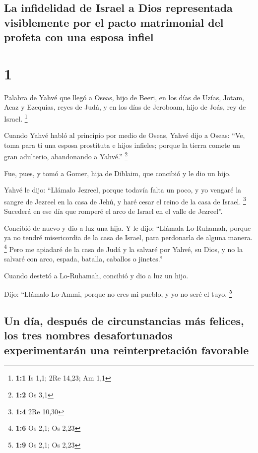 \hypertarget{la-infidelidad-de-israel-a-dios-representada-visiblemente-por-el-pacto-matrimonial-del-profeta-con-una-esposa-infiel}{%
\subsection{La infidelidad de Israel a Dios representada visiblemente
por el pacto matrimonial del profeta con una esposa
infiel}\label{la-infidelidad-de-israel-a-dios-representada-visiblemente-por-el-pacto-matrimonial-del-profeta-con-una-esposa-infiel}}

\hypertarget{section}{%
\section{1}\label{section}}

 Palabra de Yahvé que llegó a Oseas, hijo de Beeri, en los
días de Uzías, Jotam, Acaz y Ezequías, reyes de Judá, y en los días de
Jeroboam, hijo de Joás, rey de Israel. \footnote{\textbf{1:1} Is 1,1;
  2Re 14,23; Am 1,1}

 Cuando Yahvé habló al principio por medio de Oseas, Yahvé
dijo a Oseas: ``Ve, toma para ti una esposa prostituta e hijos infieles;
porque la tierra comete un gran adulterio, abandonando a Yahvé.''
\footnote{\textbf{1:2} Os 3,1}

 Fue, pues, y tomó a Gomer, hija de Diblaim, que concibió
y le dio un hijo.

 Yahvé le dijo: ``Llámalo Jezreel, porque todavía falta un
poco, y yo vengaré la sangre de Jezreel en la casa de Jehú, y haré cesar
el reino de la casa de Israel. \footnote{\textbf{1:4} 2Re 10,30}
 Sucederá en ese día que romperé el arco de Israel en el
valle de Jezreel''.

 Concibió de nuevo y dio a luz una hija. Y le dijo:
``Llámala Lo-Ruhamah, porque ya no tendré misericordia de la casa de
Israel, para perdonarla de alguna manera. \footnote{\textbf{1:6} Os 2,1;
  Os 2,23}  Pero me apiadaré de la casa de Judá y la
salvaré por Yahvé, su Dios, y no la salvaré con arco, espada, batalla,
caballos o jinetes.''

 Cuando destetó a Lo-Ruhamah, concibió y dio a luz un
hijo.

 Dijo: ``Llámalo Lo-Ammi, porque no eres mi pueblo, y yo
no seré el tuyo. \footnote{\textbf{1:9} Os 2,1; Os 2,23}

\hypertarget{un-duxeda-despuuxe9s-de-circunstancias-muxe1s-felices-los-tres-nombres-desafortunados-experimentaruxe1n-una-reinterpretaciuxf3n-favorable}{%
\subsection{Un día, después de circunstancias más felices, los tres
nombres desafortunados experimentarán una reinterpretación
favorable}\label{un-duxeda-despuuxe9s-de-circunstancias-muxe1s-felices-los-tres-nombres-desafortunados-experimentaruxe1n-una-reinterpretaciuxf3n-favorable}}

